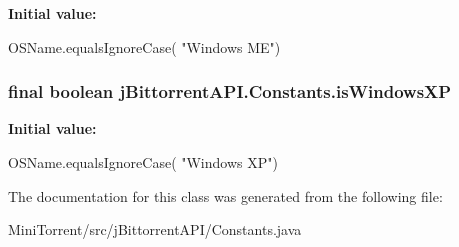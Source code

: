 \label{classj_bittorrent_a_p_i_1_1_constants_a46866fe74f0e1f12733aedca1b21c988}
{\bfseries Initial value:}
\begin{DoxyCode}
 OSName.equalsIgnoreCase(
            "Windows ME")
\end{DoxyCode}
\hypertarget{classj_bittorrent_a_p_i_1_1_constants_a62b66ffe4117ea27e6a67af04d79bf86}{
\subsubsection[{isWindowsXP}]{\setlength{\rightskip}{0pt plus 5cm}final boolean jBittorrentAPI.Constants.isWindowsXP}}
\label{classj_bittorrent_a_p_i_1_1_constants_a62b66ffe4117ea27e6a67af04d79bf86}
{\bfseries Initial value:}
\begin{DoxyCode}
 OSName.equalsIgnoreCase(
            "Windows XP")
\end{DoxyCode}


The documentation for this class was generated from the following file:\begin{DoxyCompactItemize}
\item 
MiniTorrent/src/jBittorrentAPI/Constants.java\end{DoxyCompactItemize}
